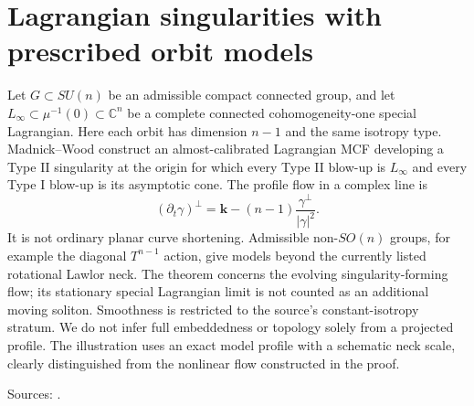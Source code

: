 \chapter{Lagrangian singularities with prescribed orbit models}\label{sec:catalogue-cohomogeneity-one-lagrangian-singularities}
\begin{example}\label{ex:catalogue-cohomogeneity-one-lagrangian-singularities}
Let $G\subset SU(n)$ be an admissible compact connected group, and let $L_\infty\subset\mu^{-1}(0)\subset\mathbb C^n$ be a complete connected cohomogeneity-one special Lagrangian. Here each orbit has dimension $n-1$ and the same isotropy type. Madnick--Wood construct an almost-calibrated Lagrangian MCF developing a Type II singularity at the origin for which every Type II blow-up is $L_\infty$ and every Type I blow-up is its asymptotic cone.
The profile flow in a complex line is
\[
 (\partial_t\gamma)^\perp=\mathbf k-(n-1)\frac{\gamma^\perp}{|\gamma|^2}.
\]
It is not ordinary planar curve shortening. Admissible non-$SO(n)$ groups, for example the diagonal $T^{n-1}$ action, give models beyond the currently listed rotational Lawlor neck. The theorem concerns the evolving singularity-forming flow; its stationary special Lagrangian limit is not counted as an additional moving soliton. Smoothness is restricted to the source's constant-isotropy stratum. We do not infer full embeddedness or topology solely from a projected profile. The illustration uses an exact model profile with a schematic neck scale, clearly distinguished from the nonlinear flow constructed in the proof.
\par Sources: \cite{CatMadnickWood2025}.
\end{example}

